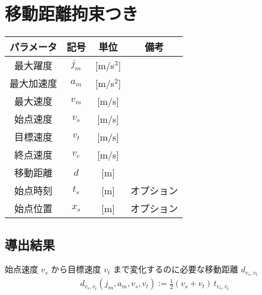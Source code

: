 \documentclass[a5paper]{ltjsarticle}
\begin{document}
\clearpage
\section{移動距離拘束つき}
\begin{table}[htbp]
    \centering
    \begin{tabular}{c|c|c|c}
        パラメータ & 記号  & 単位        & 備考       \\ \hline\hline
        最大躍度   & $j_m$ & [m/s${}^3$] &            \\
        最大加速度 & $a_m$ & [m/s${}^2$] &            \\
        最大速度   & $v_m$ & [m/s]       &            \\
        始点速度   & $v_s$ & [m/s]       &            \\
        目標速度   & $v_t$ & [m/s]       &            \\
        終点速度   & $v_e$ & [m/s]       &            \\
        移動距離   & $d$   & [m]         &            \\
        始点時刻   & $t_s$ & [m]         & オプション \\
        始点位置   & $x_s$ & [m]         & オプション \\
    \end{tabular}
\end{table}

\subsection{導出結果}
始点速度 $v_s$ から目標速度 $v_t$ まで変化するのに必要な移動距離 $d_{v_s,v_t}$
\begin{align}
    d_{v_s,v_t}(j_m,a_m,v_s,v_t)
    := \frac{1}{2}(v_s+v_t) \, t_{v_s,v_t}
\end{align}
\end{document}
